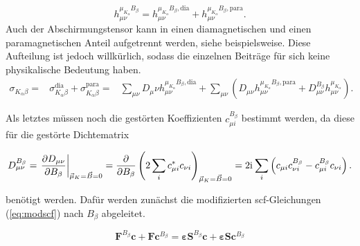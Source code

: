      \begin{equation}
     h_{\mu\nu}^{\mu_{K_\alpha}B_\beta}=h_{\mu\nu}^{\mu_{K_\alpha}B_\beta,\textrm{dia}}+h_{\mu\nu}^{\mu_{K_\alpha}B_\beta,\textrm{para}}.
	\end{equation}      
     Auch der Abschirmungstensor kann in einen diamagnetischen und einen paramagnetischen Anteil aufgetrennt werden, siehe beispielsweise\supercite{ditchfield1974self}. Diese Aufteilung ist jedoch willkürlich, sodass die einzelnen Beiträge für sich keine physikalische Bedeutung haben. 
     \begin{equation}
     \begin{aligned}
     \sigma_{K_\alpha\beta}=&\sigma_{K_\alpha\beta}^{\textrm{dia}}+\sigma_{K_\alpha\beta}^{\textrm{para}}
     =&\sum_{\mu\nu}D_\mu\nu h_{\mu\nu}^{\mu_{K_\alpha}B_\beta,\textrm{dia}} +\sum_{\mu\nu}\left(D_{\mu\nu} h_{\mu\nu}^{\mu_{K_\alpha}B_\beta,\textrm{para}}+D_{\mu\nu}^{B_\beta} h_{\mu\nu}^{\mu_{K_\alpha}}\right).
     \end{aligned}
     \end{equation}
     
     Als letztes müssen noch die gestörten Koeffizienten $c_{\mu i}^{B_\beta}$ bestimmt werden, da diese für die gestörte Dichtematrix  
     
     \begin{equation}
     D_{\mu\nu}^{B_\beta}=\left.\frac{\partial D_{\mu\nu}}{\partial B_\beta}\right\vert_{\vec{\mu}_K=\vec{B}=0}=\frac{\partial}{\partial B_\beta}\left(2\sum_i c_{\mu i}^*c_{\nu i}\right)_{\vec{\mu}_K=\vec{B}=0}=2\mathrm{i}\mkern1mu \sum_i\left(c_{\mu i}c_{\nu i}^{B_\beta}-c_{\mu i}^{B_\beta}c_{\nu i}\right).
     \end{equation}
     
     benötigt werden. Dafür werden zunächst die modifizierten \ac{scf}-Gleichungen (\ref{eq:modscf}) nach $B_\beta$ abgeleitet.
     
    \begin{equation}
	  \boldsymbol{F}^{B_\beta}\boldsymbol{c}+\boldsymbol{F}\boldsymbol{c}^{B_\beta}=\boldsymbol{\varepsilon}\boldsymbol{S}^{B_\beta}\boldsymbol{c}+\boldsymbol{\varepsilon}\boldsymbol{S}\boldsymbol{c}^{B_\beta}
	\end{equation}
     
      
     
     
     
     
     
     
     
     
     

